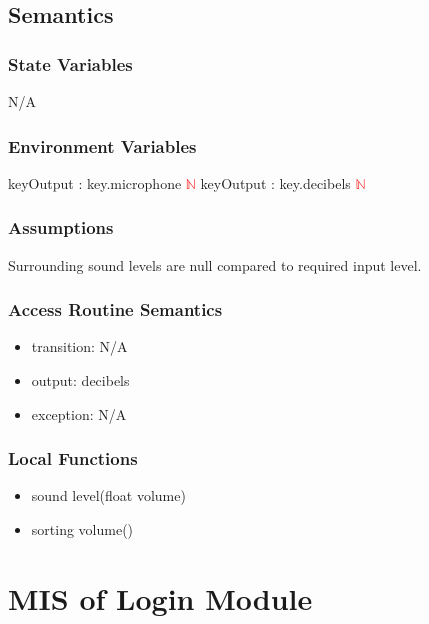 \documentclass[12pt, titlepage]{article}
\begin{document}
\subsection{Semantics}

\subsubsection{State Variables}

N/A

\subsubsection{Environment Variables}

keyOutput : {key.microphone} \textcolor{red}{$\mathbb{N}$ }
\newline
keyOutput : {key.decibels} \textcolor{red}{$\mathbb{N}$}

\subsubsection{Assumptions}

Surrounding sound levels are null compared to required input level.

\subsubsection{Access Routine Semantics}

\noindent
\begin{itemize}
\item transition: N/A 
\item output: decibels
\item exception: N/A
\end{itemize}

\subsubsection{Local Functions}
\begin{itemize}
\item sound level(float volume)
\item sorting volume()
\end{itemize}



\section{MIS of Login Module} \label{Login Module}
\end{document}
